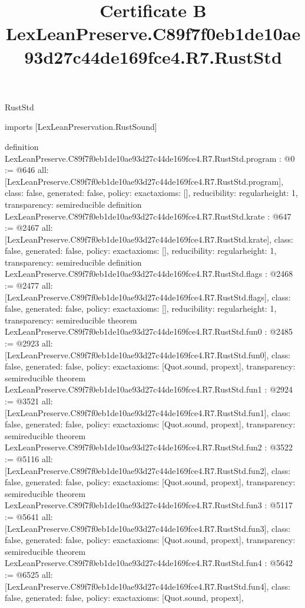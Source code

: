 \begin{lexlean}{RustStd}
\title{Certificate B LexLeanPreserve.C89f7f0eb1de10ae93d27c44de169fce4.R7.RustStd}
\begin{coremodule}
imports [LexLeanPreservation.RustSound]

definition LexLeanPreserve.C89f7f0eb1de10ae93d27c44de169fce4.R7.RustStd.program : @0 := @646 {
  all: [LexLeanPreserve.C89f7f0eb1de10ae93d27c44de169fce4.R7.RustStd.program],
  class: false,
  generated: false,
  policy: exact{axioms: []},
  reducibility: regular{height: 1},
  transparency: semireducible
}
definition LexLeanPreserve.C89f7f0eb1de10ae93d27c44de169fce4.R7.RustStd.krate : @647 := @2467 {
  all: [LexLeanPreserve.C89f7f0eb1de10ae93d27c44de169fce4.R7.RustStd.krate],
  class: false,
  generated: false,
  policy: exact{axioms: []},
  reducibility: regular{height: 1},
  transparency: semireducible
}
definition LexLeanPreserve.C89f7f0eb1de10ae93d27c44de169fce4.R7.RustStd.flags : @2468 := @2477 {
  all: [LexLeanPreserve.C89f7f0eb1de10ae93d27c44de169fce4.R7.RustStd.flags],
  class: false,
  generated: false,
  policy: exact{axioms: []},
  reducibility: regular{height: 1},
  transparency: semireducible
}
theorem LexLeanPreserve.C89f7f0eb1de10ae93d27c44de169fce4.R7.RustStd.fun0 : @2485 := @2923 {
  all: [LexLeanPreserve.C89f7f0eb1de10ae93d27c44de169fce4.R7.RustStd.fun0],
  class: false,
  generated: false,
  policy: exact{axioms: [Quot.sound, propext]},
  transparency: semireducible
}
theorem LexLeanPreserve.C89f7f0eb1de10ae93d27c44de169fce4.R7.RustStd.fun1 : @2924 := @3521 {
  all: [LexLeanPreserve.C89f7f0eb1de10ae93d27c44de169fce4.R7.RustStd.fun1],
  class: false,
  generated: false,
  policy: exact{axioms: [Quot.sound, propext]},
  transparency: semireducible
}
theorem LexLeanPreserve.C89f7f0eb1de10ae93d27c44de169fce4.R7.RustStd.fun2 : @3522 := @5116 {
  all: [LexLeanPreserve.C89f7f0eb1de10ae93d27c44de169fce4.R7.RustStd.fun2],
  class: false,
  generated: false,
  policy: exact{axioms: [Quot.sound, propext]},
  transparency: semireducible
}
theorem LexLeanPreserve.C89f7f0eb1de10ae93d27c44de169fce4.R7.RustStd.fun3 : @5117 := @5641 {
  all: [LexLeanPreserve.C89f7f0eb1de10ae93d27c44de169fce4.R7.RustStd.fun3],
  class: false,
  generated: false,
  policy: exact{axioms: [Quot.sound, propext]},
  transparency: semireducible
}
theorem LexLeanPreserve.C89f7f0eb1de10ae93d27c44de169fce4.R7.RustStd.fun4 : @5642 := @6525 {
  all: [LexLeanPreserve.C89f7f0eb1de10ae93d27c44de169fce4.R7.RustStd.fun4],
  class: false,
  generated: false,
  policy: exact{axioms: [Quot.sound, propext]},
}
\end{coremodule}
\end{lexlean}
